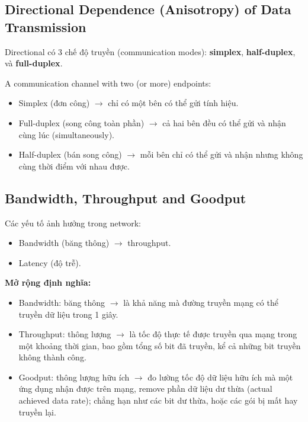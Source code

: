 \subsection{Directional Dependence (Anisotropy) of Data Transmission}

\noindent
Directional có 3 chế độ truyền (communication modes): \textbf{simplex}, \textbf{half-duplex}, và \textbf{full-duplex}.
\medskip

\noindent
A communication channel with two (or more) endpoints:

\begin{itemize}
    \item Simplex (đơn công) $\rightarrow$ chỉ có một bên có thể gửi tính hiệu.
    \item Full-duplex (song công toàn phần) $\rightarrow$ cả hai bên đều có thể gửi và nhận cùng lúc (simultaneously).
    \item Half-duplex (bán song công) $\rightarrow$ mỗi bên chỉ có thể gửi và nhận nhưng không cùng thời điểm với nhau được.
\end{itemize}



\subsection{Bandwidth, Throughput and Goodput}

\noindent
Các yếu tố ảnh hưởng trong network:

\begin{itemize}
    \item Bandwidth (băng thông) $\rightarrow$ throughput.
    \item Latency (độ trễ).
\end{itemize}
\medskip

\noindent
\textbf{Mở rộng định nghĩa:}

\begin{itemize}
    \item Bandwidth: băng thông $\rightarrow$ là khả năng mà đường truyền mạng có thể truyền dữ liệu trong 1 giây.
    \item Throughput: thông lượng $\rightarrow$ là tốc độ thực tế được truyền qua mạng trong một khoảng thời gian, bao gồm tổng số bit đã truyền, kể cả những bit truyền không thành công.
    \item Goodput: thông lượng hữu ích $\rightarrow$ đo lường tốc độ dữ liệu hữu ích mà một ứng dụng nhận được trên mạng, remove phần dữ liệu dư thừa (actual achieved data rate); chẳng hạn như các bit dư thừa, hoặc các gói bị mất hay truyền lại.
\end{itemize}
\medskip

